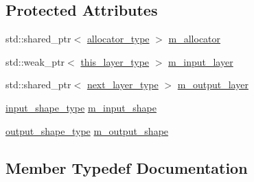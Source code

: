 \subsection*{Protected Attributes}
\begin{DoxyCompactItemize}
\item 
std\+::shared\+\_\+ptr$<$ \hyperlink{structbc_1_1nn_1_1Polymorphic__Layer__Base_a1414f8c37dea6254aebf63e4486ed818}{allocator\+\_\+type} $>$ \hyperlink{structbc_1_1nn_1_1Polymorphic__Layer__Base_a871e8bf7f3ea5e729e00c6bb6ae6f769}{m\+\_\+allocator}
\item 
std\+::weak\+\_\+ptr$<$ \hyperlink{structbc_1_1nn_1_1Polymorphic__Layer__Base_a6087076d2e0a31e6bbdc2c2039c3ab52}{this\+\_\+layer\+\_\+type} $>$ \hyperlink{structbc_1_1nn_1_1Polymorphic__Layer__Base_abf80deb81025924557a3f7eca809d4e3}{m\+\_\+input\+\_\+layer}
\item 
std\+::shared\+\_\+ptr$<$ \hyperlink{structbc_1_1nn_1_1Polymorphic__Layer__Base_ac7d70db83e8370d2975d05401713f677}{next\+\_\+layer\+\_\+type} $>$ \hyperlink{structbc_1_1nn_1_1Polymorphic__Layer__Base_a9fed7a02ea5b0ea5bea55e8060e1ded2}{m\+\_\+output\+\_\+layer}
\item 
\hyperlink{structbc_1_1nn_1_1Polymorphic__Layer__Base_ad69ba46ce14f9fbef88b834828052ab4}{input\+\_\+shape\+\_\+type} \hyperlink{structbc_1_1nn_1_1Polymorphic__Layer__Base_a0e1021b5d112fed042d030eb5d44b7c2}{m\+\_\+input\+\_\+shape}
\item 
\hyperlink{structbc_1_1nn_1_1Polymorphic__Layer__Base_a130df92a457150349fe554eeee4dd32a}{output\+\_\+shape\+\_\+type} \hyperlink{structbc_1_1nn_1_1Polymorphic__Layer__Base_a6706ea4d62aee77f603a0c723e7088eb}{m\+\_\+output\+\_\+shape}
\end{DoxyCompactItemize}


\subsection{Member Typedef Documentation}
\mbox{\label{structbc_1_1nn_1_1Polymorphic__Layer__Base_a1414f8c37dea6254aebf63e4486ed818}} 
